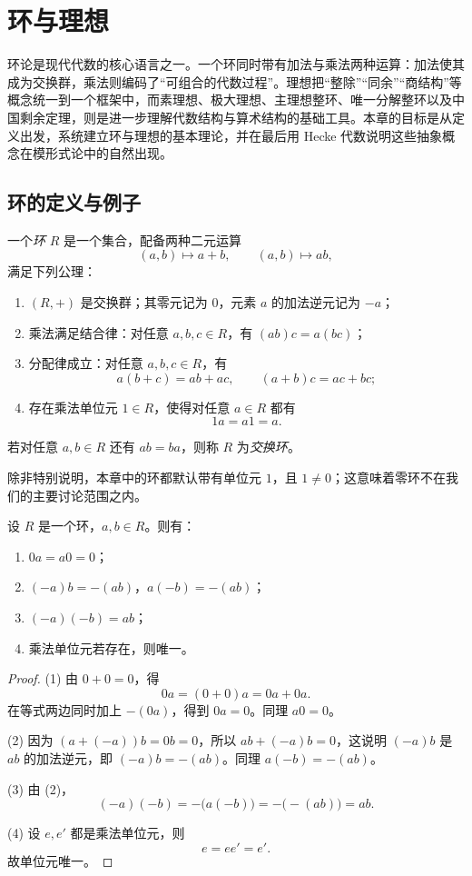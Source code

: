 \chapter{环与理想}

环论是现代代数的核心语言之一。一个环同时带有加法与乘法两种运算：加法使其成为交换群，乘法则编码了“可组合的代数过程”。理想把“整除”“同余”“商结构”等概念统一到一个框架中，而素理想、极大理想、主理想整环、唯一分解整环以及中国剩余定理，则是进一步理解代数结构与算术结构的基础工具。本章的目标是从定义出发，系统建立环与理想的基本理论，并在最后用 Hecke 代数说明这些抽象概念在模形式论中的自然出现。

\section{环的定义与例子}

\begin{definition}
一个\emph{环} $R$ 是一个集合，配备两种二元运算
\[
(a,b)\longmapsto a+b,\qquad (a,b)\longmapsto ab,
\]
满足下列公理：
\begin{enumerate}[label=\textnormal{(R\arabic*)}]
  \item $(R,+)$ 是交换群；其零元记为 $0$，元素 $a$ 的加法逆元记为 $-a$；
  \item 乘法满足结合律：对任意 $a,b,c\in R$，有 $(ab)c=a(bc)$；
  \item 分配律成立：对任意 $a,b,c\in R$，有
  \[
  a(b+c)=ab+ac,\qquad (a+b)c=ac+bc;
  \]
  \item 存在乘法单位元 $1\in R$，使得对任意 $a\in R$ 都有
  \[
  1a=a1=a.
  \]
\end{enumerate}
若对任意 $a,b\in R$ 还有 $ab=ba$，则称 $R$ 为\emph{交换环}。
\end{definition}

除非特别说明，本章中的环都默认带有单位元 $1$，且 $1\neq 0$；这意味着零环不在我们的主要讨论范围之内。

\begin{proposition}
设 $R$ 是一个环，$a,b\in R$。则有：
\begin{enumerate}[label=\textnormal{(\arabic*)}]
  \item $0a=a0=0$；
  \item $(-a)b=-(ab)$，$a(-b)=-(ab)$；
  \item $(-a)(-b)=ab$；
  \item 乘法单位元若存在，则唯一。
\end{enumerate}
\end{proposition}

\begin{proof}
(1) 由 $0+0=0$，得
\[
0a=(0+0)a=0a+0a.
\]
在等式两边同时加上 $-(0a)$，得到 $0a=0$。同理 $a0=0$。

(2) 因为 $(a+(-a))b=0b=0$，所以 $ab+(-a)b=0$，这说明 $(-a)b$ 是 $ab$ 的加法逆元，即 $(-a)b=-(ab)$。同理 $a(-b)=-(ab)$。

(3) 由 (2)，
\[
(-a)(-b)=-\bigl(a(-b)\bigr)=-\bigl(-(ab)\bigr)=ab.
\]

(4) 设 $e,e'$ 都是乘法单位元，则
\[
e=ee'=e'.
\]
故单位元唯一。
\end{proof}

